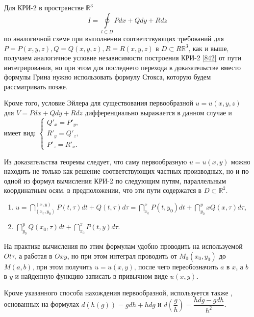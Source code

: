 \begin{notes}
	\item Для КРИ-2 в пространстве $\mathbb{R}^3$
	\begin{equation}
	\label{842}
	I = \oint\limits_{l \subset D} Pdx + Qdy + Rdz
	\end{equation}
	по аналогичной схеме при выполнении соответствующих требований для $P = P(x,y,z), Q = Q(x,y,z), R = R(x,y,z)$ в $D \subset R\mathbb{R}^3$, как и выше, получаем аналогичное условие независимости построения КРИ-2 \eqref{842} от пути интегрирования, но при этом для последнего перехода в доказательстве вместо формулы Грина нужно использовать формулу Стокса, которую будем рассматривать позже. 
	
	Кроме того, условие Эйлера для существования первообразной $u = u(x,y,z)$ для $V = Pdx + Qdy + Rdz$ дифференциально выражается в данном случае и имеет вид: $\begin{cases}
	Q'_x = P'_y, \\ R'_y = Q'_z, \\ P'_z = R'_x.
	\end{cases}$
	\item Из доказательства теоремы следует, что саму первообразную $u = u(x,y)$ можно находить не только как решение соответствующих частных производных, но и по одной из формул вычисления КРИ-2 по следующим путям, параллельным координатным осям, в предположении, что эти пути содержатся в $D \subset \mathbb{R}^2$.
	\begin{enumerate}
		\item $u = \dint_{(x_0, y_0)}^{(x,y)} P(t, \tau) dt + Q(t, \tau)d \tau = \dint_{x_0}^x P(t, y_0)dt + \dint_{y_0}^yx Q(x, \tau)d \tau$,
		\item $\dint_{y_0}^y Q(x_0, \tau) dt + \dint_{x_0}^x P(t, y)d \tau$.
	\end{enumerate}
	
	На практике вычисления по этим формулам удобно проводить на используемой $Ot \tau$, а работая в $Oxy$, но при этом интеграл проводить от $M_0 (x_0, y_0)$ до $M(a,b)$, при этом получить $u = u(x,y)$, после чего переобозначить $a$ в $x$, а $b$ в $y$ и найденную функцию записать в привычном виде $u(x,y)$.
	
	Кроме указанного способа нахождения первообразной, используется также , основанных на формулах $d(h(g)) = gdh + hdg$ и $d \left(\dfrac{g}{h} \right) = \dfrac{hdg - gdh}{h^2}$.
\end{notes}

